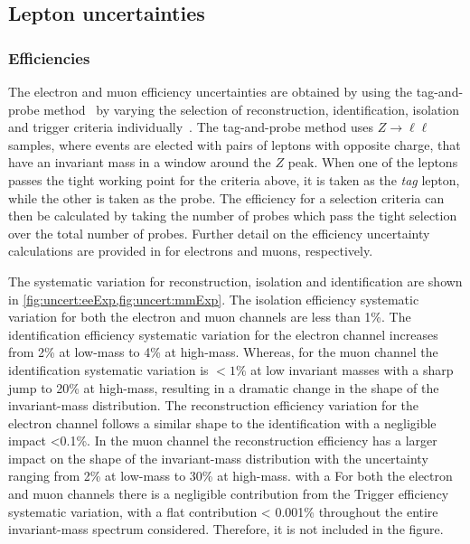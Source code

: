 \subsection{Lepton uncertainties}

\subsubsection{Efficiencies}
The electron and muon efficiency uncertainties are obtained by using the tag-and-probe method~\cite{Aaboud:2016vfy,Aad:2016jkr} by varying the selection of reconstruction, identification, isolation and trigger criteria individually~\cite{Aad:2019tso,Aad:2016jkr}. The tag-and-probe method uses $Z\rightarrow \ell\ell$ samples, where events are elected with pairs of leptons with opposite charge, that have an invariant mass in a window around the $Z$ peak. When one of the leptons passes the tight working point for the criteria above, it is taken as the \emph{tag} lepton, while the other is taken as the probe. The efficiency for a selection criteria can then be calculated by taking the number of probes which pass the tight selection over the total number of probes. Further detail on the efficiency uncertainty calculations are provided in \cite{Aad:2019tso,Aad:2016jkr} for electrons and muons, respectively. 

The systematic variation for reconstruction, isolation and identification are shown in \cref{fig:uncert:eeExp,fig:uncert:mmExp}. The isolation efficiency systematic variation for both the electron and muon channels are less than 1\%. The identification efficiency systematic variation for the electron channel increases from 2\% at low-mass to 4\% at high-mass. Whereas, for the muon channel the identification systematic variation is $< 1\%$ at low invariant masses with a sharp jump to 20\% at high-mass, resulting in a dramatic change in the shape of the invariant-mass distribution. The reconstruction efficiency variation for the electron channel follows a similar shape to the identification with a negligible impact <0.1\%. In the muon channel the reconstruction efficiency has a larger impact on the shape of the invariant-mass distribution with the uncertainty ranging from 2\% at low-mass to 30\% at high-mass. with a For both the electron and muon channels there is a negligible contribution from the Trigger efficiency systematic variation, with a flat contribution < 0.001\% throughout the entire invariant-mass spectrum considered. Therefore, it is not included in the figure. 

